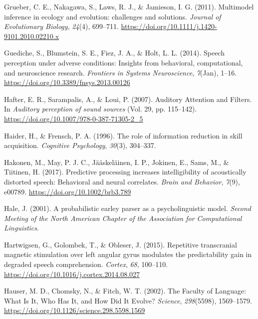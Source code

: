 \documentclass[a4paper, nobind]{templates/ociamthesis}
\newlength{\cslhangindent}
\newenvironment{CSLReferences}[2] %
 {%
  \setlength{\parindent}{0pt}
  \ifodd #1
  \let\oldpar\par
  \def\par{\hangindent=\cslhangindent\oldpar}
  \fi
  \setlength{\parskip}{1mm}
  \setlength{\baselineskip}{6mm}
 }%
 {}
\begin{document}
\begin{CSLReferences}{1}{0}
\leavevmode{}%
Grueber, C. E., Nakagawa, S., Laws, R. J., \& Jamieson, I. G. (2011). Multimodel inference in ecology and evolution: challenges and solutions. \emph{Journal of Evolutionary Biology}, \emph{24}(4), 699--711. \url{https://doi.org/10.1111/j.1420-9101.2010.02210.x}

\leavevmode{}%
Guediche, S., Blumstein, S. E., Fiez, J. A., \& Holt, L. L. (2014). {Speech perception under adverse conditions: Insights from behavioral, computational, and neuroscience research}. \emph{Frontiers in Systems Neuroscience}, \emph{7}(Jan), 1--16. \url{https://doi.org/10.3389/fnsys.2013.00126}

\leavevmode{}%
Hafter, E. R., Sarampalis, A., \& Loui, P. (2007). {Auditory Attention and Filters}. In \emph{Auditory perception of sound sources} (Vol. 29, pp. 115--142). \url{https://doi.org/10.1007/978-0-387-71305-2_5}

\leavevmode{}%
Haider, H., \& Frensch, P. A. (1996). The role of information reduction in skill acquisition. \emph{Cognitive Psychology}, \emph{30}(3), 304--337.

\leavevmode{}%
Hakonen, M., May, P. J. C., Jääskeläinen, I. P., Jokinen, E., Sams, M., \& Tiitinen, H. (2017). Predictive processing increases intelligibility of acoustically distorted speech: Behavioral and neural correlates. \emph{Brain and Behavior}, \emph{7}(9), e00789. \url{https://doi.org/10.1002/brb3.789}

\leavevmode{}%
Hale, J. (2001). A probabilistic earley parser as a psycholinguistic model. \emph{Second Meeting of the North American Chapter of the Association for Computational Linguistics}.

\leavevmode{}%
Hartwigsen, G., Golombek, T., \& Obleser, J. (2015). Repetitive transcranial magnetic stimulation over left angular gyrus modulates the predictability gain in degraded speech comprehension. \emph{Cortex}, \emph{68}, 100--110. \url{https://doi.org/10.1016/j.cortex.2014.08.027}

\leavevmode{}%
Hauser, M. D., Chomsky, N., \& Fitch, W. T. (2002). The Faculty of Language: What Is It, Who Has It, and How Did It Evolve? \emph{Science}, \emph{298}(5598), 1569--1579. \url{https://doi.org/10.1126/science.298.5598.1569}


\end{CSLReferences}
\end{document}
